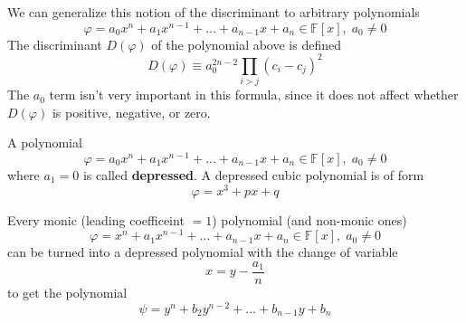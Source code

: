  \begin{definition}
    We can generalize this notion of the discriminant to arbitrary polynomials
    \begin{equation}
      \varphi = a_0 x^n + a_1 x^{n-1} + ... + a_{n-1} x + a_n \in \mathbb{F}[x], \; a_0 \neq 0
    \end{equation}
    The discriminant $D(\varphi)$ of the polynomial above is defined
    \begin{equation}
      D(\varphi) \equiv a_0^{2n-2} \prod_{i>j} (c_i - c_j)^2
    \end{equation}
    The $a_0$ term isn't very important in this formula, since it does not affect whether $D(\varphi)$ is positive, negative, or zero. 
  \end{definition}

  \begin{definition}
    A polynomial 
    \begin{equation}
      \varphi = a_0 x^n + a_1 x^{n-1} + ... + a_{n-1} x + a_n \in \mathbb{F}[x], \; a_0 \neq 0
    \end{equation}
    where $a_1 = 0$ is called \textbf{depressed}. A depressed cubic polynomial is of form
    \begin{equation}
      \varphi = x^3 + p x + q
    \end{equation}
  \end{definition}

  \begin{proposition}
    Every monic (leading coefficeint $=1$) polynomial (and non-monic ones) 
    \begin{equation}
      \varphi = x^n + a_1 x^{n-1} + ... + a_{n-1} x + a_n \in \mathbb{F}[x], \; a_0 \neq 0
    \end{equation}
    can be turned into a depressed polynomial with the change of variable
    \begin{equation}
      x = y - \frac{a_1}{n}
    \end{equation}
    to get the polynomial 
    \begin{equation}
      \psi = y^n + b_2 y^{n-2} + ... + b_{n-1} y + b_n
    \end{equation}
  \end{proposition}

